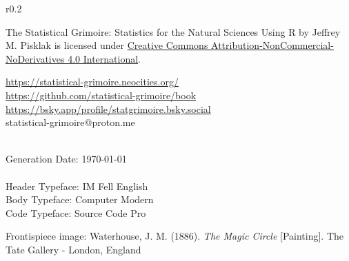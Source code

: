 \vspace*{\fill}

\setlength{\intextsep}{1pt}%
\setlength{\columnsep}{8pt}%
\begin{wrapfigure}{r}{0.2\textwidth}
\href{https://creativecommons.org/licenses/by-nc-nd/4.0/}{}
\end{wrapfigure}

{
\noindent
The Statistical Grimoire: Statistics for the Natural Sciences Using R by \mbox{Jeffrey} M. Pisklak is licensed under \href{https://creativecommons.org/licenses/by-nc-nd/4.0/}{Creative Commons Attribution-NonCommercial-NoDerivatives 4.0 International}.

\noindent
{} \url{https://statistical-grimoire.neocities.org/} \\
 \url{https://github.com/statistical-grimoire/book} \\
 \url{https://bsky.app/profile/statgrimoire.bsky.social} \\
 statistical-grimoire@proton.me

\noindent
\luatexbanner \\
Generation Date: \today{} \\
\\
\noindent
Header Typeface: IM Fell English \\
Body Typeface: Computer Modern \\
Code Typeface: Source Code Pro \parencite{SourceCodePro}

\noindent
Frontispiece image: Waterhouse, J. M. (1886). \textit{The Magic Circle} [Painting]. The Tate Gallery - London, England
}



